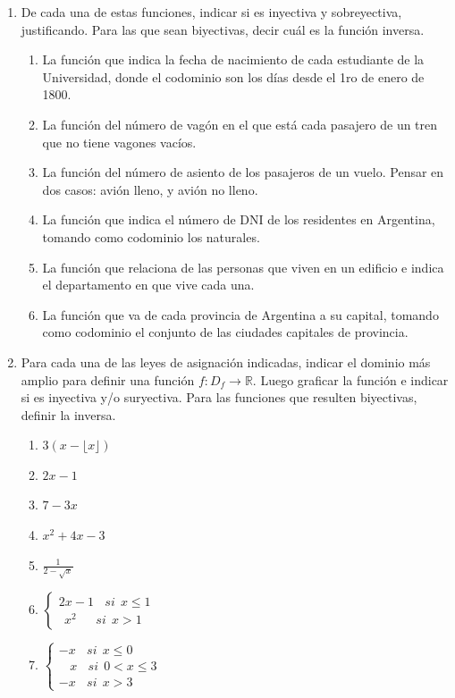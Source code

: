 \documentclass[a4paper]{article}
\newcommand{\exercise}{\item}
\begin{document}
\begin{enumerate}
\begin{enumerate} [label=(\alph*)]
	\end{enumerate}
	\exercise De cada una de estas funciones, indicar si es inyectiva y sobreyectiva, justificando. Para las que sean biyectivas, decir cuál es la función inversa.
	\begin{enumerate} [label=(\alph*)]
		\item La función que indica la fecha de nacimiento de cada estudiante de la Universidad, donde el codominio son los días desde el 1ro de enero de 1800.
		\item La función del número de vagón en el que está cada pasajero de un tren que no tiene vagones vacíos.
		\item La función del número de asiento de los pasajeros de un vuelo. Pensar en dos casos: avión lleno, y avión no lleno.
		\item La función que indica el número de DNI de los residentes en Argentina, tomando como codominio los naturales.
		\item La función que relaciona de las personas que viven en un edificio e indica el departamento en que vive cada una.
		\item La función que va de cada provincia de Argentina a su capital, tomando como codominio el conjunto de las ciudades capitales de provincia.
	\end{enumerate}
	\exercise Para cada una de las leyes de asignación indicadas, indicar el dominio más amplio para definir una función $f: D_{f} \to \mathbb{R}$. Luego graficar la función e indicar si es inyectiva y/o suryectiva. Para las funciones que resulten biyectivas, definir la inversa.
	\begin{multicols}{2}
	\begin{enumerate} [label=(\alph*)]
		\item $3(x-\lfloor x \rfloor)$
		\item $2x-1$
		\item $7-3x$
		\item $x^2+4x-3$
		\item $\displaystyle{\frac{1}{2-\sqrt{x}}}$
		\item $\left\{\begin{matrix}2x-1 ~~~~ si ~~x\leq 1\\ ~~x^2~~ ~~~~~ si ~~x>1\end{matrix}\right.$
		\item $\left\{\begin{matrix}-x ~~~~ si ~~x\leq 0~~~\\ ~~~~x  ~~~~  si ~~0<x\leq 3 \\ -x ~~~~ si ~~x>3~~~\end{matrix}\right.$

\end{enumerate}
\end{multicols}
\end{enumerate}
\end{document}
